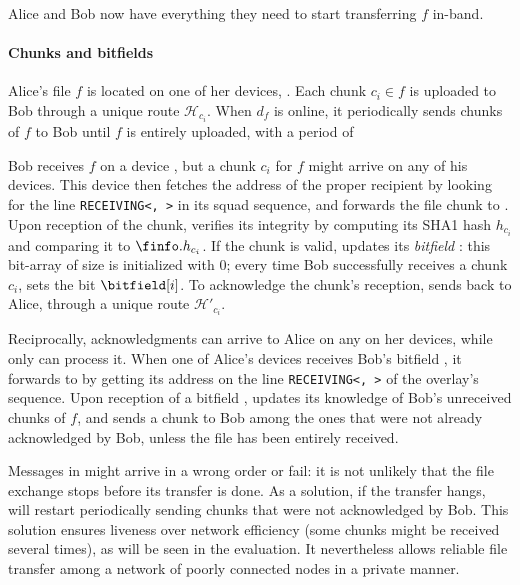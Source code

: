 Alice and Bob now have everything they need to start transferring $f$ in-band.


\paragraph*{Chunks and bitfields}
Alice's file $f$ is located on one of her devices, \sendingdevice. 
Each chunk $c_i \in f$ is uploaded to Bob through a unique route $\mathcal{H}_{c_i}$.
When $d_f$ is online, it periodically sends chunks of $f$ to Bob until $f$ is entirely uploaded, with a period of 

Bob receives $f$ on a device \recdevice, but a chunk $c_i$ for $f$ might arrive on any of his devices. 
This device then fetches the address of the proper recipient \recdevice by looking for the line \texttt{RECEIVING<\recdevice, \fileid>} in its squad sequence, 
and forwards the file chunk to \recdevice.
Upon reception of the chunk, \recdevice verifies its integrity by computing its SHA1 hash $h_{c_i}$ and comparing it to $\finfo.h_{c_i}$.
If the chunk is valid, \recdevice updates its \emph{bitfield} \bitfield: this bit-array of size \nchunks is initialized with 0;
every time Bob successfully receives a chunk $c_i$, \recdevice sets the bit $\bitfield[i]$.
To acknowledge the chunk's reception, \recdevice sends \bitfield back to Alice, through a unique route $\mathcal{H}'_{c_i}$.

Reciprocally, acknowledgments can arrive to Alice on any on her devices, while only \sendingdevice can process it.
When one of Alice's devices receives Bob's bitfield \bitfield, 
it forwards \bitfield to \sendingdevice by getting its address on the line \texttt{RECEIVING<\sendingdevice, \fileid>} of the \squad overlay's sequence.
Upon reception of a bitfield \bitfield, \recdevice updates its knowledge of Bob's unreceived chunks of $f$,
and sends a chunk to Bob among the ones that were not already acknowledged by Bob, unless the file has been entirely received.

Messages in \name might arrive in a wrong order or fail:
it is not unlikely that the file exchange stops before its transfer is done.
As a solution, if the transfer hangs, \sendingdevice will restart periodically sending chunks that were not acknowledged by Bob.
This solution ensures liveness over network efficiency (some chunks might be received several times), as will be seen in the evaluation.
It nevertheless allows reliable file transfer among a network of poorly connected nodes in a private manner.